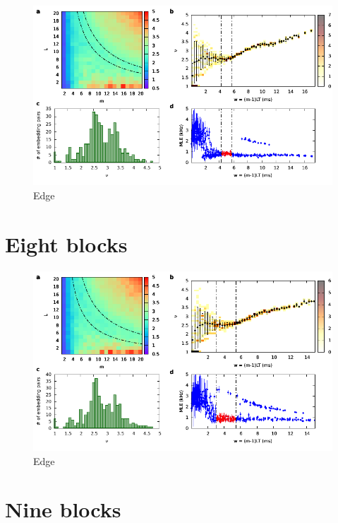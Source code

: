 \begin{figure}[H]
    \centering
    \includegraphics[width=\linewidth]{../7_blocks/edge/2e5_points/plots/chaos_low.pdf}
    \caption{Edge}
    \label{fig:7 blocks chaos}
\end{figure}

\section{Eight blocks}

\begin{figure}[H]
    \centering
    \includegraphics[width=\linewidth]{../8_blocks/2e5_points/plots/chaos_low.pdf}
    \caption{Edge}
    \label{fig:8 blocks chaos}
\end{figure}

\section{Nine blocks}

